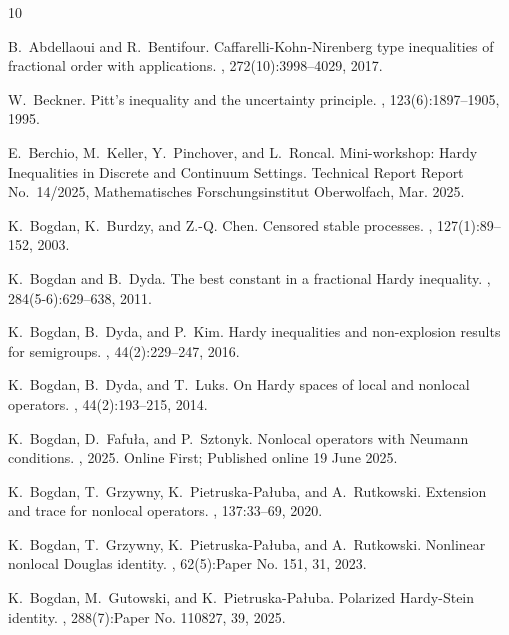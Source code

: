 \documentclass[12pt, a4paper]{amsart}
\begin{document}
%
\begin{thebibliography}{10}

B.~Abdellaoui and R.~Bentifour.
\newblock Caffarelli-{K}ohn-{N}irenberg type inequalities of fractional order with applications.
, 272(10):3998--4029, 2017.

W.~Beckner.
\newblock Pitt's inequality and the uncertainty principle.
, 123(6):1897--1905, 1995.

E.~Berchio, M.~Keller, Y.~Pinchover, and L.~Roncal.
\newblock Mini-workshop: {Hardy Inequalities in Discrete and Continuum Settings}.
\newblock Technical Report Report No.~14/2025, Mathematisches Forschungsinstitut Oberwolfach, Mar. 2025.

K.~Bogdan, K.~Burdzy, and Z.-Q. Chen.
\newblock Censored stable processes.
, 127(1):89--152, 2003.

K.~Bogdan and B.~Dyda.
\newblock The best constant in a fractional {H}ardy inequality.
, 284(5-6):629--638, 2011.

K.~Bogdan, B.~Dyda, and P.~Kim.
\newblock Hardy inequalities and non-explosion results for semigroups.
, 44(2):229--247, 2016.

K.~Bogdan, B.~Dyda, and T.~Luks.
\newblock On {H}ardy spaces of local and nonlocal operators.
, 44(2):193--215, 2014.

K.~Bogdan, D.~Fafu{\l}a, and P.~Sztonyk.
\newblock Nonlocal operators with {Neumann} conditions.
, 2025.
\newblock Online First; Published online 19 June 2025.

K.~Bogdan, T.~Grzywny, K.~Pietruska-Pa{\l}uba, and A.~Rutkowski.
\newblock Extension and trace for nonlocal operators.
, 137:33--69, 2020.

K.~Bogdan, T.~Grzywny, K.~Pietruska-Pa\l{}uba, and A.~Rutkowski.
\newblock Nonlinear nonlocal {D}ouglas identity.
, 62(5):Paper No. 151, 31, 2023.

K.~Bogdan, M.~Gutowski, and K.~Pietruska-Pa{\l}uba.
\newblock Polarized {H}ardy-{S}tein identity.
, 288(7):Paper No. 110827, 39, 2025.


\end{thebibliography}
\end{document}
